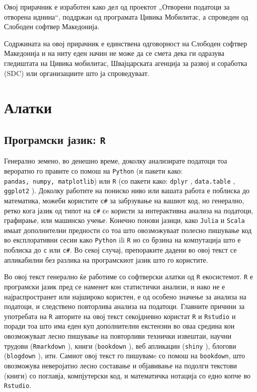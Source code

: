 \documentclass[
]{book}
\begin{document}
Овој прирачник е изработен како дел од проектот „Отворени податоци за отворена иднина``, поддржан од програмата Цивика Мобилитас, а спроведен од Слободен софтвер Македонија.

Содржината на овој прирачник е единствена одговорност на Слободен софтвер Македонија и на ниту еден начин не може да се смета дека ги одразува гледиштата на Цивика мобилитас, Швајцарската агенција за развој и соработка (SDC) или организациите што ја спроведуваат.

\hypertarget{tools}{%
\chapter{Алатки}\label{tools}}

\hypertarget{ux43fux440ux43eux433ux440ux430ux43cux441ux43aux438-ux458ux430ux437ux438ux43a-r}{%
\section{\texorpdfstring{Програмски јазик: \texttt{R}}{Програмски јазик: R}}\label{ux43fux440ux43eux433ux440ux430ux43cux441ux43aux438-ux458ux430ux437ux438ux43a-r}}

Генерално земено, во денешно време, доколку анализирате податоци тоа вероратно го правите со помош на \texttt{Python} (и пакети како: \texttt{pandas,\ numpy,\ matplotlib}) или \texttt{R} (со пакети како: \texttt{dplyr} \citep{R-dplyr}, \texttt{data.table} \citep{R-data.table}, \texttt{ggplot2} \citep{R-ggplot2}). Доколку работите на пониско ниво или вашата работа е поблиска до математика, можеби користите \texttt{c\#} за забрзување на вашиот код, но генерално, ретко кога јазик од типот на \texttt{c\#} сe користи за интерактивна анализа на податоци, графирање, или машинско учење. Конечно понови јазици, како \texttt{Julia} и \texttt{Scala} имаат дополнителни предности со тоа што овозможуваат полесно пишување код во експлоративни сесии како \texttt{Python} ili \texttt{R} но со брзина на компутација што е поблиска до \texttt{c} или \texttt{c\#}. Во секој случај, препораките дадени во овој текст се апликабилни без разлика на програмскиот јазик што го користите.

Во овој текст генерално ќе работиме со софтверски алатки од \texttt{R} екосистемот. \texttt{R} е програмски јазик пред се наменет кон статистички анализи, и иако не е најраспространет или најшироко користен, е од особено значење за анализа на податоци, и следствено повторлива анализа на податоци. Главните причини за употребата на \texttt{R} авторите на овој текст секојдневно користат \texttt{R} и \texttt{Rstudio} и поради тоа што има еден куп дополнителни екстензии во оваа средина кои овозможуваат лесно пишување на повторливи технички извештаи, научни трудови (\texttt{Rmarkdown} \citep{R-rmarkdown}), книги (\texttt{bookdown} \citep{R-bookdown}), веб апликации (\texttt{shiny} \citep{R-shiny}), блогови (\texttt{blogdown} \citep{R-blogdown}), итн. Самиот овој текст го пишувамe со помош на \texttt{bookdown}, што овозможува неверојатно лесно составање и објавивање на подолги текстови (книги) со поглавја, компјутерски код, и математичка нотација со едно копче во \texttt{Rstudio}.
\end{document}

